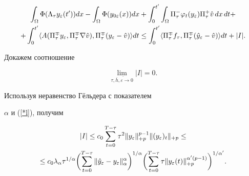 \begin{gather}


\int_{\Omega} \Phi(\Lambda_\tau y_\varepsilon (t'))dx


- \int_{\Omega} \Phi (y_{0\varepsilon}(x)) dx +


 \int^{t'}_{0} \int_{\Omega}


 \Pi^{-}_{\tau} \varphi_t(y_\varepsilon) \Pi^{+}_{\tau}\Hat{v}\, dx\, dt+


\notag \\


%


+


\int^{t'}_{0}


\langle A(  \Pi^{\mp}_{\tau}{y}_\varepsilon, \Pi^{\mp}_{\tau}


\nabla \Hat{v} ), \Pi^{\mp}_{\tau} ({y}_\varepsilon


- \Hat{v} ) \rangle dt \le


 \int^{t'}_{0} \langle \Pi^{\mp}_{\tau} f_\tau,


  \Pi^{\mp}_{\tau} (\Hat{y}_\varepsilon - \Hat{v} ) \rangle dt + |I|.


\label{4.5z}


\end{gather}





Докажем соотношение


\begin{equation}


\lim_{\tau,\overline{\overline{h},\varepsilon \to} 0} | I | =  0.


\label{(4.34)}


\end{equation}


Используя неравенство Г\"ельдера  с показателем


$\alpha$ и (\ref{*l}), получим


\begin{gather}


|I| \le


c_{0} \sum^{T-\tau}_{t=0} \tau^{2}


\| y_\varepsilon \|^{p-1}_{+p}


 \| (y_\varepsilon)_{t} \|_{+p}\le\notag\\


%


\le c_{0}


 \lambda _{\alpha }\tau^{1/\alpha}


\biggl( \sum^{T-\tau}_{t=0}\|\Hat{y}_\varepsilon-y_\varepsilon \|


^{\alpha }_{\alpha} \biggr)^{1/\alpha}


\biggl( \sum^{T-\tau}_{t=0}\tau


 \|  y_\varepsilon(t) \| ^{\alpha '(p-1)}_{+p} \biggr)


^{1/\alpha ' }.\label{(4.35)}


\end{gather}


